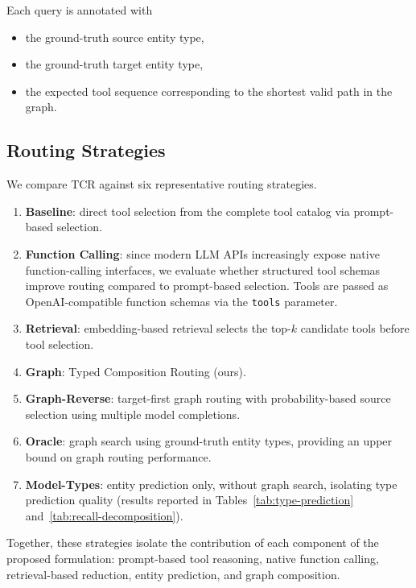 Each query is annotated with

\begin{itemize}
    \item the ground-truth source entity type,
    \item the ground-truth target entity type,
    \item the expected tool sequence corresponding to the shortest valid path in the graph.
\end{itemize}

\subsection{Routing Strategies}
\label{sec:strategies}

We compare TCR against six representative routing strategies.

\begin{enumerate}
    \item \textbf{Baseline}: direct tool selection from the complete tool catalog via prompt-based selection.
    \item \textbf{Function Calling}: since modern LLM APIs increasingly expose native function-calling interfaces, we evaluate whether structured tool schemas improve routing compared to prompt-based selection. Tools are passed as OpenAI-compatible function schemas via the \texttt{tools} parameter.
    \item \textbf{Retrieval}: embedding-based retrieval selects the top-$k$ candidate tools before tool selection.
    \item \textbf{Graph}: Typed Composition Routing (ours).
    \item \textbf{Graph-Reverse}: target-first graph routing with probability-based source selection using multiple model completions.
    \item \textbf{Oracle}: graph search using ground-truth entity types, providing an upper bound on graph routing performance.
    \item \textbf{Model-Types}: entity prediction only, without graph search, isolating type prediction quality (results reported in Tables~\ref{tab:type-prediction} and~\ref{tab:recall-decomposition}).
\end{enumerate}

Together, these strategies isolate the contribution of each component of the proposed formulation: prompt-based tool reasoning, native function calling, retrieval-based reduction, entity prediction, and graph composition.

